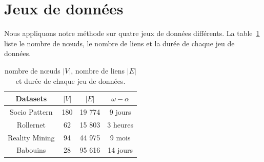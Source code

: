 \section{Jeux de données}
\label{sec:groupe_dense_data}
Nous appliquons notre méthode sur quatre jeux de données différents.
La table~\ref{tab:data_spec_groupe_dense} liste le nombre de n\oe{}uds, le nombre de liens et la durée de chaque jeu de données.

\begin{table}[h]
\centering

\begin{tabular}{|c|c|c|c|}
\hline  \rule[-1ex]{0pt}{3.5ex}
Datasets & $|V|$ & $|E|$ & $\omega - \alpha$\\
\hline
Socio Pattern & 180 & 19 774 & 9 jours \\
Rollernet & 62 & 15 803 & 3 heures\\
Reality Mining & 94 & 44 975 & 9 mois\\
Babouins & 28 & 95 616 & 14 jours\\
\hline
\end{tabular}
\caption{nombre de n\oe{}uds $|V|$, nombre de liens $|E|$ et durée de chaque jeu de données.}
\label{tab:data_spec_groupe_dense} 
\end{table}

